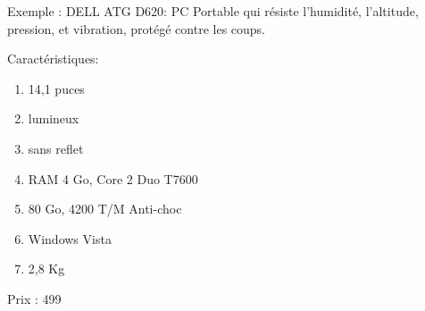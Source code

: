 Exemple : DELL ATG D620: PC Portable qui résiste l'humidité, l'altitude,
pression, et vibration, protégé contre les coups.
	
	Caractéristiques:

	\begin{enumerate} \item 14,1 puces \item lumineux \item sans reflet
	\item RAM 4 Go, Core 2 Duo T7600 \item 80 Go, 4200 T/M Anti-choc
	\item Windows Vista \item 2,8 Kg \end{enumerate}

Prix : 499 \euros 
